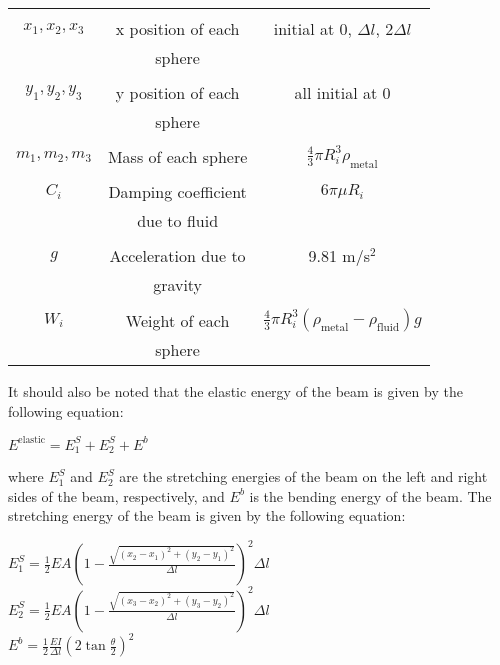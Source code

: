 \documentclass[letterpaper, 10 pt, conference]{ieeeconf}  %
\begin{document}
\begin{table}[h]
\begin{center}
\begin{tabular}{|c|c|c|}
& & \\ $x_1, x_2, x_3$ & x position of each & initial at 0, $\Delta l$, $2\Delta l$\\ & sphere & \\
& & \\ $y_1, y_2, y_3$ & y position of each & all initial at 0\\ & sphere & \\
& & \\ $m_1, m_2, m_3$ & Mass of each sphere & $\frac{4}{3}\pi R_i^3 \rho_{\text{metal}}$\\
& & \\ $C_i$ & Damping coefficient& $6 \pi \mu R_i$ \\ &  due to fluid & \\
& & \\ $g$ & Acceleration due to  & 9.81 m/s\(^2\) \\ & gravity & \\
& & \\ $W_i$ & Weight of each & $\frac{4}{3} \pi R_i^3(\rho_{\text{metal}}-\rho_{\text{fluid}})g$ \\ & sphere & \\
\hline
\end{tabular}
\end{center}
\end{table}

It should also be noted that the elastic energy of the beam is given by the following equation:
\begin{center}
        $E^{\text{elastic}} = E^S_1 + E^S_2 + E^b$
\end{center}
where $E^S_1$ and $E^S_2$ are the stretching energies of the beam on the left and right sides of the beam, respectively, and $E^b$ is the bending energy of the beam. The stretching energy of the beam is given by the following equation:
\begin{center}
        $E^S_1 = \frac{1}{2}EA\left( 1 - \frac{\sqrt{(x_2 - x_1)^2 + (y_2 - y_1)^2 }}{\Delta l}\right)^2 \Delta l$ \\



        $E^S_2 = \frac{1}{2}EA\left( 1 - \frac{\sqrt{(x_3 - x_2)^2 + (y_3 - y_2)^2 }}{\Delta l}\right)^2 \Delta l$ \\



        $E^b = \frac{1}{2} \frac{EI}{\Delta l}\left( 2 \tan{\frac{\theta}{2}} \right)^2$
\end{center}
\end{document}
